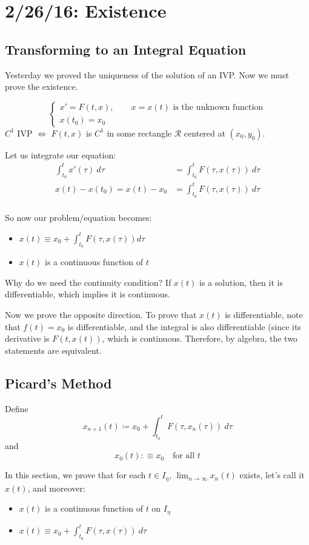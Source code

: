 \documentclass[12pt]{article}
\begin{document}
\section{2/26/16: Existence}
\subsection{Transforming to an Integral Equation}
Yesterday we proved the uniqueness of the solution of an IVP. Now we must prove the existence. 

\[
\begin{cases}
x' = F(t,x), \qquad x = x(t) \text{ is the unknown function} \\
x(t_0) = x_0
\end{cases}
\]
$C^1$ IVP $\Leftrightarrow$ $F(t,x)$ is $C^1$ in some rectangle $\mathcal{R}$ centered at $(x_0,y_0)$.

Let us integrate our equation:
\[ 
\begin{aligned}
\int_{t_0}^t x'(\tau) \ d\tau &= \int_{t_0}^t F(\tau,x(\tau)) \ d\tau \\
x(t) - x(t_0) = x(t) - x_0 &= \int_{t_0}^t F(\tau,x(\tau)) \ d\tau \\
\end{aligned}
\]

So now our problem/equation becomes:
\begin{itemize}
\item $x(t) \equiv x_0 + \displaystyle\int_{t_0}^t F(\tau,x(\tau)) d\tau$
\item $x(t)$ is a continuous function of $t$
\end{itemize}
Why do we need the continuity condition? If $x(t)$ is a solution, then it is differentiable, which implies it is continuous. 

Now we prove the opposite direction. To prove that $x(t)$ is differentiable, note that $f(t) = x_0$ is differentiable, and the integral is also differentiable (since its derivative is $F(t,x(t))$, which is continuous. Therefore, by algebra, the two statements are equivalent.

\subsection{Picard's Method}

Define \[ x_{n+1}(t) \coloneqq x_0 + \int_{t_0}^t F(\tau, x_n(\tau)) \ d\tau \]
and
\[ x_0(t) :\equiv x_0 \quad \text{for all } t \]

In this section, we prove that for each $t \in I_{\eta}$, $\displaystyle\lim_{n \to \infty}x_n(t)$ exists, let's call it $x(t)$, and moreover: 
\begin{itemize}
\item $x(t)$ is a continuous function of $t$ on $I_{\eta}$
\item $x(t) \equiv x_0 + \displaystyle\int_{t_0}^t F(\tau, x(\tau)) \ d\tau$
\end{itemize}
\end{document}
